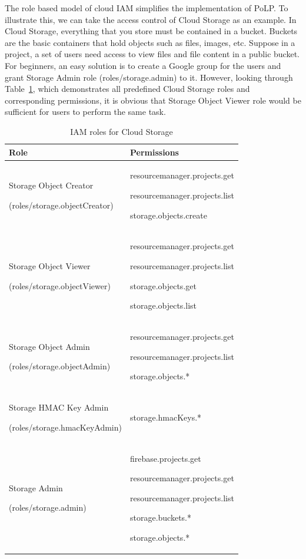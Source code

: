 \documentclass[a4paper,twoside]{article}
\begin{document}
The role based model of cloud IAM simplifies the implementation of PoLP. To illustrate this, we can take the access control of Cloud Storage as an example. In Cloud Storage, everything that you store must be contained in a bucket. Buckets are the basic containers that hold objects such as files, images, etc. Suppose in a project, a set of users need access to view files and file content in a public bucket. For beginners, an easy solution is to create a Google group for the users and grant Storage Admin role (roles/storage.admin) to it. However, looking through Table~\ref{table:sto-role}, which demonstrates all predefined Cloud Storage roles and corresponding permissions, it is obvious that Storage Object Viewer role would be sufficient for users to perform the same task. 
\begin{table}[t]
    \caption{IAM roles for Cloud Storage} \centering
    \begin{tabular}{|p{4.2cm}|p{4cm}|}
    \hline
    Role & Permissions\\
    \hline
    \hline
    Storage Object Creator\par(roles/storage.objectCreator) &  resourcemanager.projects.get \par resourcemanager.projects.list \par storage.objects.create \\ %
    \hline
    Storage Object Viewer\par(roles/storage.objectViewer) & resourcemanager.projects.get\par resourcemanager.projects.list\par storage.objects.get\par storage.objects.list \\ %
    \hline
    Storage Object Admin\par(roles/storage.objectAdmin) & resourcemanager.projects.get \par resourcemanager.projects.list\par storage.objects.*\\ %
    \hline
    Storage HMAC Key Admin\par(roles/storage.hmacKeyAdmin) &storage.hmacKeys.*\\
    \hline
     Storage Admin\par(roles/storage.admin) &firebase.projects.get\par resourcemanager.projects.get\par resourcemanager.projects.list\par storage.buckets.*\par storage.objects.*\\
    \hline
    \end{tabular}
    \label{table:sto-role}
\end{table}
\end{document}
